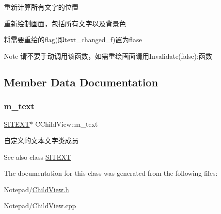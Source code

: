 \begin{DoxyItemize}
\item 重新计算所有文字的位置
\item 重新绘制画面，包括所有文字以及背景色
\item 将需要重绘的flag(即text\+\_\+changed\+\_\+f)置为flase \begin{DoxyNote}{Note}
请不要手动调用该函数，如需重绘画面请用\+Invalidate(false);函数 
\end{DoxyNote}

\end{DoxyItemize}

\subsection{Member Data Documentation}
\mbox{\label{class_c_child_view_a7a8d14e1c1adfb50fa6e033ebc05a357}} 
\subsubsection{\texorpdfstring{m\+\_\+text}{m\_text}}
{\footnotesize\ttfamily \hyperlink{class_s_i_t_e_x_t}{S\+I\+T\+E\+XT}$\ast$ C\+Child\+View\+::m\+\_\+text}



自定义的文本文字类成员 

\begin{DoxySeeAlso}{See also}
class \hyperlink{class_s_i_t_e_x_t}{S\+I\+T\+E\+XT} 
\end{DoxySeeAlso}


The documentation for this class was generated from the following files\+:\begin{DoxyCompactItemize}
\item 
Notepad/\hyperlink{_child_view_8h}{Child\+View.\+h}\item 
Notepad/Child\+View.\+cpp\end{DoxyCompactItemize}
